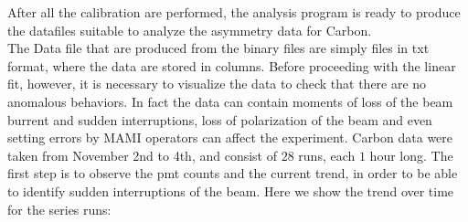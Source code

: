 After all the calibration are performed, the analysis program is ready to produce the datafiles suitable to analyze the asymmetry data for Carbon. \\
The Data file that are produced from the binary files are simply files in txt format, where the data are stored in columns. Before proceeding with the linear fit, however, it is necessary to visualize the data to check that there are no anomalous behaviors. In fact the data can contain moments of loss of the beam burrent and sudden interruptions, loss of polarization of the beam and even setting errors by MAMI operators can affect the experiment. Carbon data were taken from November 2nd to 4th, and consist of $28$ runs, each $1$ hour long.
The first step is to observe the pmt counts and the current trend, in order to be able to identify sudden interruptions of the beam. Here we show the trend over time for the series runs: 

\begin{figure}[hbtp]
\centering
{}
\end{figure}

